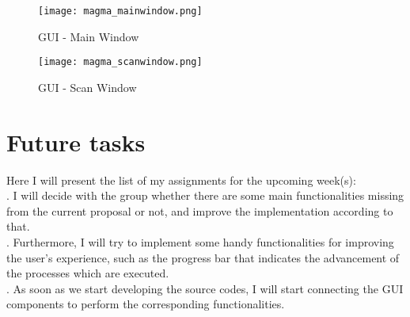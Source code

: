 \documentclass[aps,letterpaper,11pt]{revtex4}
\begin{document}
\begin{figure}[!htb]
  \texttt{[image: magma\_mainwindow.png]}
  \caption{GUI - Main Window}
  \label{fig:Kinect2}
\end{figure}

\begin{figure}[!htb]
  \texttt{[image: magma\_scanwindow.png]}
  \caption{GUI - Scan Window}
  \label{fig:MladenCloud}
\end{figure}
\newpage
\section {Future tasks}
Here I will present the list of my assignments for the upcoming week(s):\\
. I will decide with the group whether there are some main functionalities missing from the current proposal or not, and improve the implementation according to that.\\
. Furthermore, I will try to implement some handy functionalities for improving the user's experience, such as the progress bar that indicates the advancement of the processes which are executed.\\
. As soon as we start developing the source codes, I will start connecting the GUI components to perform the corresponding functionalities.
\end{document}
